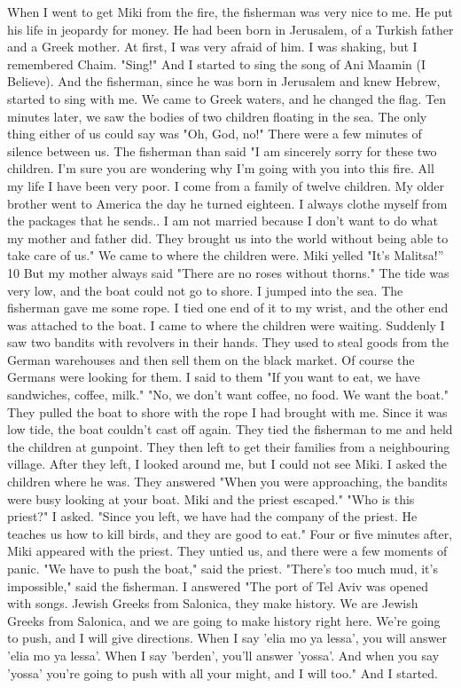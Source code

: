 When I went to get Miki from the fire, the fisherman was very nice 
to me. He put his life in jeopardy for money. He had been born in Jerusalem, of a Turkish father and a Greek mother. At first, I was very afraid of him. I was shaking, but I remembered Chaim. "Sing!" And I started to sing the song of Ani Maamin (I Believe). And the fisherman, since he was born in Jerusalem and knew Hebrew, started to sing with me. We 
came to Greek waters, and he changed the flag. Ten minutes later, we
saw the bodies of two children floating in the sea. The only thing either 
of us could say was "Oh, God, no!" There were a few minutes of silence
between us. The fisherman than said "I am sincerely sorry for these two 
children. I'm sure you are wondering why I'm going with you into this 
fire. All my life I have been very poor. I come from a family of twelve 
children. My older brother went to America the day he turned eighteen. 
I always clothe myself from the packages that he sends.. I am not married 
because I don't want to do what my mother and father did. They brought 
us into the world without being able to take care of us." 
We came to where the children were. Miki yelled "It's Malitsa!” 10 But 
my mother always said "There are no roses without thorns." The tide was 
very low, and the boat could not go to shore. I jumped into the sea. The 
fisherman gave me some rope. I tied one end of it to my wrist, and the 
other end was attached to the boat. I came to where the children were 
waiting. Suddenly I saw two bandits with revolvers in their hands. They 
used to steal goods from the German warehouses and then sell them on the 
black market. Of course the Germans were looking for them. I said to 
them "If you want to eat, we have sandwiches, coffee, milk." "No, we don't want coffee, no food. We want the boat." They pulled the boat to shore with the rope I had brought with me. Since it was low tide, the boat couldn't cast off again. They tied the fisherman to me and held the children 
at gunpoint. They then left to get their families from a neighbouring 
village. 
After they left, I looked around me, but I could not see Miki. I 
asked the children where he was. They answered "When you were approaching, the bandits were busy looking at your boat. Miki and the priest escaped." "Who is this priest?" I asked. "Since you left, we have had the company of the priest. He teaches us how to kill birds, and they are 
good to eat." Four or five minutes after, Miki appeared with the priest. 
They untied us, and there were a few moments of panic. 
"We have to push the boat," said the priest. 
"There's too much mud, it's impossible," said the fisherman. 
I answered "The port of Tel Aviv was opened with songs. Jewish Greeks
from Salonica, they make history. We are Jewish Greeks from Salonica, and 
we are going to make history right here. We're going to push, and I will 
give directions. When I say 'elia mo ya lessa', you will answer 'elia mo 
ya lessa'. When I say 'berden', you'll answer 'yossa'. And when you say 
'yossa' you're going to push with all your might, and I will too." And 
I started. 
 
